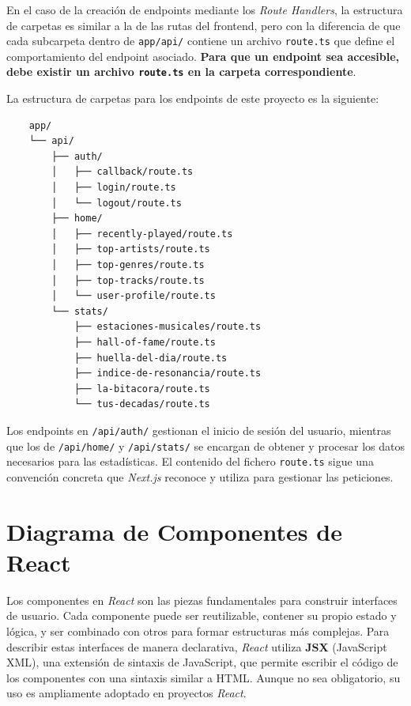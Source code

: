 En el caso de la creación de endpoints mediante los \textit{Route Handlers}, la estructura de carpetas es similar a la de las rutas del frontend, pero con la diferencia de que cada subcarpeta dentro de \texttt{app/api/} contiene un archivo \texttt{route.ts} que define el comportamiento del endpoint asociado. \textbf{Para que un endpoint sea accesible, debe existir un archivo \texttt{route.ts} en la carpeta correspondiente}.

La estructura de carpetas para los endpoints de este proyecto es la siguiente:

\newpage

\begin{verbatim}
    app/
    └── api/
        ├── auth/
        │   ├── callback/route.ts
        │   ├── login/route.ts
        │   └── logout/route.ts
        ├── home/
        │   ├── recently-played/route.ts
        │   ├── top-artists/route.ts
        │   ├── top-genres/route.ts
        │   ├── top-tracks/route.ts
        │   └── user-profile/route.ts
        └── stats/
            ├── estaciones-musicales/route.ts
            ├── hall-of-fame/route.ts
            ├── huella-del-dia/route.ts
            ├── indice-de-resonancia/route.ts
            ├── la-bitacora/route.ts
            └── tus-decadas/route.ts
\end{verbatim}

Los endpoints en \texttt{/api/auth/} gestionan el inicio de sesión del usuario, mientras que los de \texttt{/api/home/} y \texttt{/api/stats/} se encargan de obtener y procesar los datos necesarios para las estadísticas. El contenido del fichero \texttt{route.ts} sigue una convención concreta que \textit{Next.js} reconoce y utiliza para gestionar las peticiones.

\section{Diagrama de Componentes de React} \label{sec:diagrama_componentes_react}

Los componentes en \textit{React} son las piezas fundamentales para construir interfaces de usuario. Cada componente puede ser reutilizable, contener su propio estado y lógica, y ser combinado con otros para formar estructuras más complejas. Para describir estas interfaces de manera declarativa, \textit{React} utiliza \textbf{JSX} (JavaScript XML), una extensión de sintaxis de JavaScript, que permite escribir el código de los componentes con una sintaxis similar a HTML. Aunque no sea obligatorio, su uso es ampliamente adoptado en proyectos \textit{React}.

